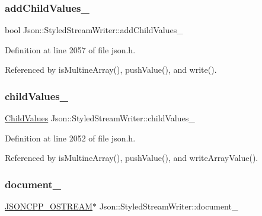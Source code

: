 \subsubsection{\texorpdfstring{add\+Child\+Values\+\_\+}{addChildValues\_}}
{\footnotesize\ttfamily bool Json\+::\+Styled\+Stream\+Writer\+::add\+Child\+Values\+\_\+\hspace{0.3cm}{\ttfamily [private]}}



Definition at line 2057 of file json.\+h.



Referenced by is\+Multine\+Array(), push\+Value(), and write().

\mbox{\label{class_json_1_1_styled_stream_writer_aafd62e00a401df73fcacb2e410114b3d}} 
\subsubsection{\texorpdfstring{child\+Values\+\_\+}{childValues\_}}
{\footnotesize\ttfamily \hyperlink{class_json_1_1_styled_stream_writer_a259bf9d99847b2ea64ec9c6dd441944e}{Child\+Values} Json\+::\+Styled\+Stream\+Writer\+::child\+Values\+\_\+\hspace{0.3cm}{\ttfamily [private]}}



Definition at line 2052 of file json.\+h.



Referenced by is\+Multine\+Array(), push\+Value(), and write\+Array\+Value().

\mbox{\label{class_json_1_1_styled_stream_writer_aa8c4e4576f5c3dcb10955d133a092dd6}} 
\subsubsection{\texorpdfstring{document\+\_\+}{document\_}}
{\footnotesize\ttfamily \hyperlink{json_8h_a37a25be5fca174927780caeb280094ce}{J\+S\+O\+N\+C\+P\+P\+\_\+\+O\+S\+T\+R\+E\+AM}$\ast$ Json\+::\+Styled\+Stream\+Writer\+::document\+\_\+\hspace{0.3cm}{\ttfamily [private]}}



